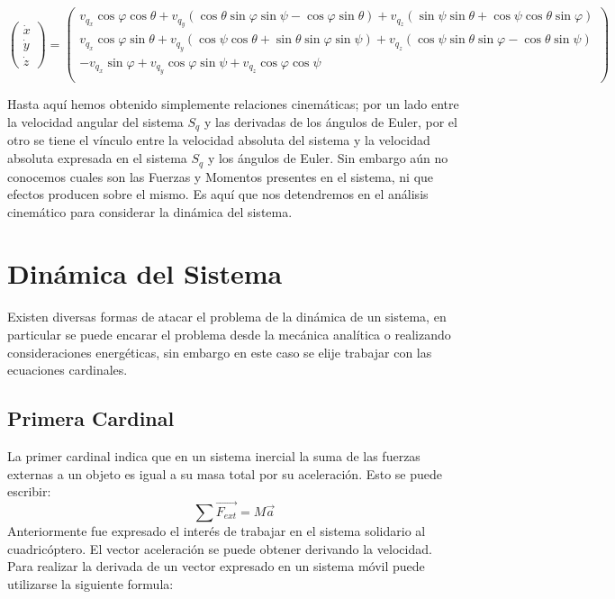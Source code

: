 \documentclass[main]{subfiles}
\begin{document}
\begin{footnotesize}

\begin{equation}
\left( \begin{array}{c}
\dot{x}\\
\dot{y}\\
\dot{z}
\end{array}  \right) = \left( \begin{array}{c}
v_{q_x} \cos \varphi \cos \theta + v_{q_y} ( \cos \theta \sin \varphi \sin \psi-\cos \varphi \sin \theta ) + v_{q_z}(\sin \psi \sin \theta + \cos \psi \cos \theta \sin \varphi)  \\
v_{q_x} \cos \varphi \sin \theta + v_{q_y} (\cos \psi \cos \theta + \sin \theta \sin \varphi \sin \psi) + v_{q_z}( \cos \psi \sin \theta \sin \varphi-\cos \theta \sin \psi ) \\
-v_{q_x} \sin \varphi  + v_{q_y} \cos \varphi \sin \psi  + v_{q_z}\cos \varphi \cos \psi \\
\end{array} \right)
\label{eq:pospunto}
\end{equation}
\end{footnotesize} 

Hasta aqu\'i hemos obtenido simplemente relaciones cinem\'aticas; por un lado entre la velocidad angular del sistema $S_q$ y las derivadas de los \'angulos de Euler, por el otro se tiene el v\'inculo entre la velocidad absoluta del sistema y la velocidad absoluta expresada en el sistema $S_q$ y los \'angulos de Euler. Sin embargo a\'un no conocemos cuales son las Fuerzas y Momentos presentes en el sistema, ni que efectos producen sobre el mismo. Es aqu\'i que nos detendremos en el an\'alisis cinem\'atico para considerar la din\'amica del sistema. 

\section{Din\'amica del Sistema}
Existen diversas formas de atacar el problema de la din\'amica de un sistema, en particular se puede encarar el problema desde la mec\'anica anal\'itica o realizando consideraciones energ\'eticas, sin embargo en este caso se elije trabajar con las ecuaciones cardinales. 
\subsection{Primera Cardinal}
 
La primer cardinal indica que en un sistema inercial la suma de las fuerzas externas a un objeto es igual a su masa total por su aceleraci\'on. Esto se puede escribir:
\begin{equation}
\sum \vec{F_{ext}} = M\vec{a}
\end{equation}
Anteriormente fue expresado el inter\'es de trabajar en el sistema solidario al cuadric\'optero. 
El vector aceleraci\'on se puede obtener derivando la velocidad. Para realizar la derivada de un vector expresado en un sistema m\'ovil puede utilizarse la siguiente formula:
\end{document}
